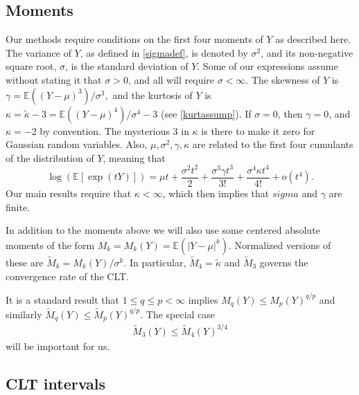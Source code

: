 \documentclass[graybox]{svmult}
\newcommand\e{\mathbb{E}}
\newcommand{\tkappa}{\tilde{\kappa}}
\begin{document}
\subsection{Moments}

Our methods require conditions on the first four moments of
$Y$ as described here. The variance of $Y$, as defined in \eqref{sigmadef}, is denoted by $\sigma^2$, and its non-negative square root, $\sigma$, is the standard deviation of $Y$.   Some of our expressions assume without stating it that $\sigma>0$, and all will require $\sigma<\infty$.  The skewness of $Y$ is
$ \gamma = \e( (Y-\mu)^3 )/\sigma^3,$
and the kurtosis of $Y$ is
$ \kappa = \tkappa-3 = \e( (Y-\mu)^4)/\sigma^4-3$ (see \eqref{kurtassump}).  If $\sigma=0$, then $\gamma=0$, and $\kappa=-2$ by convention.
The mysterious $3$ in $\kappa$ is there to
make it zero for Gaussian random variables.
Also, $\mu,\sigma^2,\gamma,\kappa$ are related to the
first four cumulants \cite[p.??]{McC87a} of the distribution of $Y$, meaning that
\[
\log(\e[\exp(tY)]) = \mu t + \frac{\sigma^2 t^2}{2} + \frac{\sigma^3 \gamma t^3}{3!} + \frac{\sigma^4 \kappa t^4}{4!} + o(t^4).
\]
Our main results require that $\kappa<\infty$, which then implies that $sigma$ and $\gamma$ are finite.

In addition to the moments above we will also
use some centered absolute moments
of the form $M_k=M_k(Y) = \e( |Y-\mu|^k)$.
Normalized versions of these are
$\widetilde M_k=M_k(Y)/\sigma^k$.
In particular, $\widetilde M_4 = \tilde\kappa$
and $\widetilde M_3$ governs the convergence rate
of the CLT.

It is a standard result that $1\le q\le p<\infty$
implies $M_q(Y) \le M_p(Y)^{q/p}$
and similarly
 $\widetilde M_q(Y) \le \widetilde M_p(Y)^{q/p}$.
The special case 
\begin{align}\label{eq:boundm3}
\widetilde M_3(Y) \le \widetilde M_4(Y)^{3/4}
\end{align}
will be important for us.

\subsection{CLT intervals}
\end{document}
